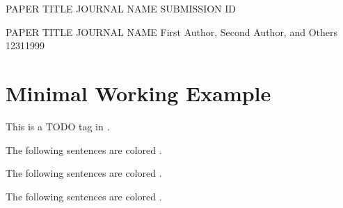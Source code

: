 \documentclass{article}
\begin{document}
\begin{anonymous_cover_letter}
    {PAPER TITLE}
    {JOURNAL NAME}
    {SUBMISSION ID}

\end{anonymous_cover_letter}

\begin{cover_letter}
    {PAPER TITLE}
    {JOURNAL NAME}
    {First Author, Second Author, and Others}
    {12}{31}{1999} %

\end{cover_letter}

\section{Minimal Working Example}

\todo{} This is a TODO tag in \todocolor{}. \todotext{\lipsum[1][1]}

The following sentences are colored \fixgrammarcolor{}.
\fixgrammar{\lipsum[1][1-5]}

The following sentences are colored \revisioncolor{}.
\revision{\lipsum[1][1-5]}

The following sentences are colored \additioncolor{}.
\addition{\lipsum[1][1-5]}


\begin{reviewer_comment}
\lipsum[1][1-5]
\end{reviewer_comment}

\begin{author_response}
\lipsum[1][6-10]
\end{author_response}
\end{document}

